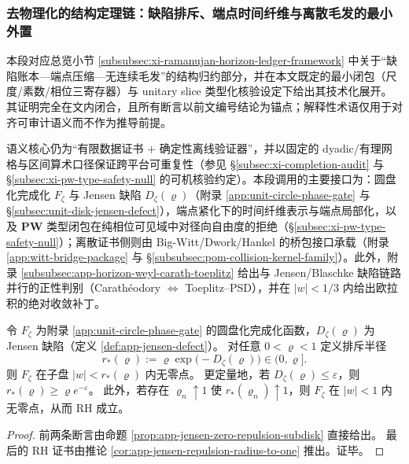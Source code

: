 \subsubsection{去物理化的结构定理链：缺陷排斥、端点时间纤维与离散毛发的最小外置}\label{subsec:dephysicalized-horizon-timefiber-nohair}
本段对应总览小节 \ref{subsubsec:xi-ramanujan-horizon-ledger-framework} 中关于“缺陷账本—端点压缩—无连续毛发”的结构归约部分，并在本文既定的最小闭包（尺度/素数/相位三寄存器）与 unitary slice 类型化核验设定下给出其技术化展开。其证明完全在文内闭合，且所有断言以前文编号结论为锚点；解释性术语仅用于对齐可审计语义而不作为推导前提。\par
语义核心仍为“有限数据证书 + 确定性离线验证器”，并以固定的 dyadic/有理网格与区间算术口径保证跨平台可重复性（参见 \S\ref{subsec:xi-completion-audit} 与 \S\ref{subsec:xi-pw-type-safety-null} 的可机核验约定）。本段调用的主要接口为：圆盘化完成化 \(F_{\zeta}\) 与 Jensen 缺陷 \(D_{\zeta}(\varrho)\)（附录 \ref{app:unit-circle-phase-gate} 与 \S\ref{subsec:unit-disk-jensen-defect}），端点紧化下的时间纤维表示与端点局部化，以及 \(\mathbf{PW}\) 类型闭包在纯相位可见域中对径向自由度的拒绝（\S\ref{subsec:xi-pw-type-safety-null}）；离散证书侧则由 Big-Witt/Dwork/Hankel 的桥包接口承载（附录 \ref{app:witt-bridge-package} 与 \S\ref{subsubsec:pom-collision-kernel-family}）。此外，附录 \ref{subsubsec:app-horizon-weyl-carath-toeplitz} 给出与 Jensen/Blaschke 缺陷链路并行的正性判别（Carath\'eodory \(\Leftrightarrow\) Toeplitz--PSD），并在 \(|w|<1/3\) 内给出欧拉积的绝对收敛补丁。

\begin{theorem}\label{thm:dephys-defect-repulsion-radius}
令 \(F_{\zeta}\) 为附录 \ref{app:unit-circle-phase-gate} 的圆盘化完成化函数，\(D_{\zeta}(\varrho)\) 为 Jensen 缺陷（定义 \ref{def:app-jensen-defect}）。
对任意 \(0<\varrho<1\) 定义排斥半径
\[
r_{\ast}(\varrho):=\varrho\exp\!\bigl(-D_{\zeta}(\varrho)\bigr)\in(0,\varrho].
\]
则 \(F_{\zeta}\) 在子盘 \(|w|<r_{\ast}(\varrho)\) 内无零点。
更定量地，若 \(D_{\zeta}(\varrho)\le \varepsilon\)，则 \(r_{\ast}(\varrho)\ge \varrho e^{-\varepsilon}\)。
此外，若存在 \(\varrho_n\uparrow 1\) 使 \(r_{\ast}(\varrho_n)\uparrow 1\)，则 \(F_{\zeta}\) 在 \(|w|<1\) 内无零点，从而 RH 成立。
\end{theorem}

\begin{proof}
前两条断言由命题 \ref{prop:app-jensen-zero-repulsion-subdisk} 直接给出。
最后的 RH 证书由推论 \ref{cor:app-jensen-repulsion-radius-to-one} 推出。证毕。
\end{proof}


